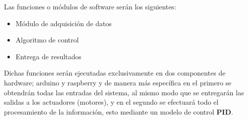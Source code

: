 Las funciones o m\'odulos de software ser\'an los siguientes:
\begin{itemize}
    \item M\'odulo de adquisici\'on de datos
    \item Algoritmo de control
    \item Entrega de resultados
\end{itemize}

Dichas funciones ser\'an ejecutadas exclusivamente en dos componentes de
hardware; arduino y raspberry y de manera m\'as espec\'ifica en el primero se
obtendr\'an todas las entradas del sistema, al mismo modo que se entregar\'an
las salidas a los actuadores (motores), y en el segundo se efectuar\'a todo el
procesamiento de la informaci\'on, esto mediante un modelo de control
\textbf{PID}.

